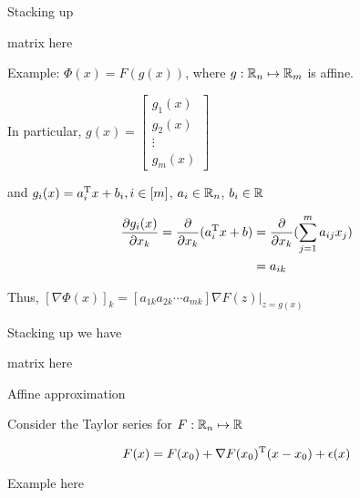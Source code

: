 Stacking up 

matrix here


Example: $\Phi(x)=F(g(x))$, where $g:\mathbb{R}_{n}\mapsto\mathbb{R}_{m}$ is affine. 

In particular, $g(x)=\left[ 
\begin{array}{c} 
	g_{1}(x) \\
	g_{2}(x) \\
	\vdots \\
	g_{m}(x)
\end{array}
\right]$

and $g_{i}(x)=a_{i}^{{\rm T}} x +b_{i}, i\in [m]$, $a_{i}\in\mathbb{R}_{n}$, $b_{i}\in\mathbb{R}$

\begin{align*}
\frac{\partial g_{i}(x)}{\partial x_{k}}=\frac{\partial}{\partial x_{k}}(a_{i}^{{\rm T}} x+b)
&=\frac{\partial}{\partial x_{k}}(\sum_{j=1}^{m}a_{ij}x_{j})\\
&=a_{ik}
\end{align*}

Thus, $[\nabla\Phi(x)]_{k}=[a_{1k} a_{2k} \cdots a_{mk}]\nabla F(z)|_{z=g(x)}$

Stacking up we have 

matrix here



Affine approximation

Consider the Taylor series for $F:\mathbb{R}_{n}\mapsto\mathbb{R}$

$$F(x)=F(x_{0})+\nabla F(x_{0})^{{\rm T}} (x-x_{0})+ \epsilon(x)$$


Example here






































 








